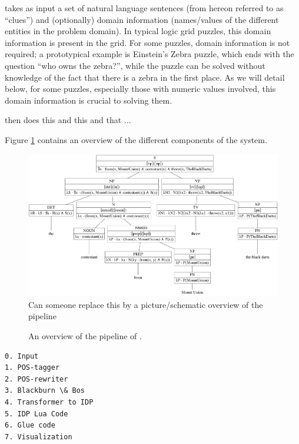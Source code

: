 \ourtool takes as input a set of natural language sentences (from hereon referred to as ``clues'') and (optionally) domain information (names/values of the different entities in the problem domain).
In typical logic grid puzzles, this domain information is present in the grid. 
For some puzzles, domain information is not required; a prototypical example is Einstein's Zebra puzzle, which ends with the question ``who owns the zebra?'', while the puzzle can be solved without knowledge of the fact that there is a zebra in the first place. 
As we will detail below, for some puzzles, especially those with numeric values involved, this domain information is crucial to solving them. 

\ourtool then does this and this and that ... 

Figure \ref{fig:overview} contains an overview of the different components of the system.

\begin{figure}
\centering
\includegraphics[width=\textwidth]{../../poster/graphviz/tree.jpg}
 Can someone replace this by a picture/schematic overview of the pipeline
 \caption{An overview of the pipeline of \ourtool.}
 \label{fig:overview}
\end{figure}




\begin{verbatim}
0. Input
1. POS-tagger
2. POS-rewriter
3. Blackburn \& Bos
4. Transformer to IDP
5. IDP Lua Code
6. Glue code
7. Visualization
\end{verbatim}

